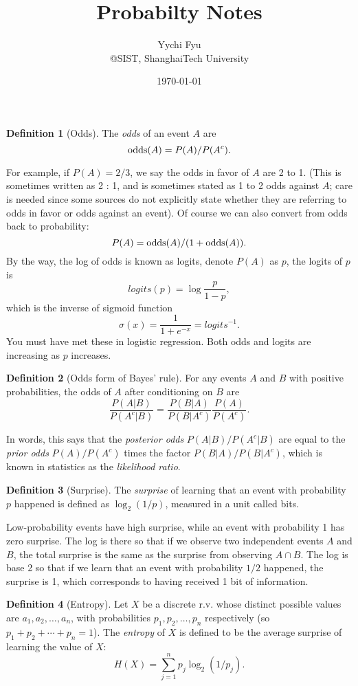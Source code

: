 \documentclass{./utils/mydoc}
\title{\bfseries \sffamily Probabilty Notes}
\author{Yychi Fyu \\ @SIST, ShanghaiTech University}
\date{\today}
\numberwithin{equation}{section} %
\theoremstyle{definition}
\newtheorem*{definition}{Definition} %
\theoremstyle{remark}
\begin{document}
\maketitle

\begin{definition}[Odds]
The \emph{odds} of an event $A$ are
\[
  \mathop{\rm odds}(A) = P(A)/P(A^c).
\]
\end{definition}
For\cite{blitzstein2019introduction} example, if $P(A) = 2/3$, we say the odds in favor of $A$ are 2 to 1. 
(This is sometimes written as 2 : 1, and is sometimes stated as 1 to 2 odds
against $A$; care is needed since some sources do not explicitly state whether
they are referring to odds in favor or odds against an event). Of course we 
can also convert from odds back to probability:
\[
  P(A) = \mathop{\rm odds}(A)/(1 + \mathop{\rm odds}(A)).
\]
By the way, the log of odds is known as logits, denote $P(A)$ as $p$, the
logits of $p$ is
\[
  logits(p) = \log \frac{p}{1-p},
\]
which is the inverse of sigmoid function
\[
  \sigma(x) = \frac{1}{1 + e^{-x}} = logits^{-1}.
\]
You must have met these in logistic regression. Both odds and logits are
increasing as $p$ increases.

\begin{definition}[Odds form of Bayes’ rule]
  For any events $A$ and $B$ with positive
  probabilities, the odds of $A$ after conditioning on $B$ are
\[
  \frac{P(A|B)}{P(A^c|B)} = \frac{P(B|A)}{P(B|A^c)}\frac{P(A)}{P(A^c)}.
\]
\end{definition}
In words, this says that the \emph{posterior odds} $P(A|B)/P(A^c|B)$ are equal
to the \emph{prior odds} $P(A)/P(A^c)$ times the factor $P(B|A)/P(B|A^c)$, 
which is known in statistics as the \emph{likelihood ratio}.

\begin{definition}[Surprise]
  The \emph{surprise} of learning that an event with probability $p$ happened is  defined as $\log_2 (1/p)$, measured in a unit called bits. 
\end{definition}
Low-probability events have high surprise, while an event with probability 1 has zero surprise. The log is there so that if we observe two independent events $A$ and $B$, the total surprise is the same as the surprise from observing $A \cap B$. The log is base 2 so that if we learn that an event with probability $1/2$ happened, the surprise is 1, which corresponds to having received 1 bit of information.

\begin{definition}[Entropy]
Let $X$ be a discrete r.v. whose distinct possible values are 
$a_1, a_2, \dots,  a_n$, with probabilities $p_1, p_2,\dots, p_n$ respectively 
(so $p_1 + p_2 + \cdots + p_n = 1$). The \emph{entropy} of $X$ is defined to 
be the average surprise of learning the value of $X$:
\[
  H(X) = \sum_{j=1}^n p_j \log_2(1/p_j).
\]
\end{definition}
\end{document}
